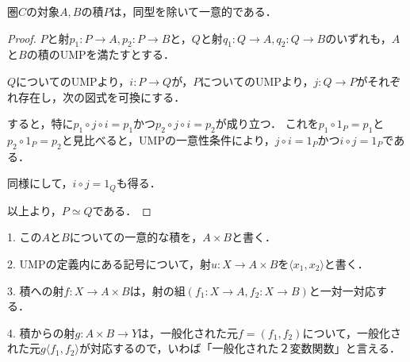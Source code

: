 \documentclass[uplatex, 12pt, dvipdfmx]{jsarticle}
\begin{document}
\begin{proposition}\label{prop-UMP-prod}
    圏$C$の対象$A,B$の積$P$は，同型を除いて一意的である．
\end{proposition}
\begin{proof}
    $P$と射$p_1:P\to A, p_2:P\to B$と，$Q$と射$q_1:Q\to A,q_2:Q\to B$のいずれも，$A$と$B$の積のUMPを満たすとする．

    $Q$についてのUMPより，$i:P\to Q$が，$P$についてのUMPより，$j:Q\to P$がそれぞれ存在し，次の図式を可換にする．
    \begin{center}
    \end{center}
    すると，特に$p_1\circ j\circ i=p_1$かつ$p_2\circ j\circ i=p_2$が成り立つ．
    これを$p_1\circ 1_P=p_1$と$p_2\circ 1_P=p_2$と見比べると，UMPの一意性条件により，$j\circ i=1_P$かつ$i\circ j=1_P$である．

    同様にして，$i\circ j=1_Q$も得る．

    以上より，$P\simeq Q$である．
\end{proof}
\begin{notation*}
    1. この$A$と$B$についての一意的な積を，$A\times B$と書く．

    2. UMPの定義内にある記号について，射$u:X\to A\times B$を$\langle x_1,x_2\rangle$と書く．

    3. 積への射$f:X\to A\times B$は，射の組$(f_1:X\to A,f_2:X\to B)$と一対一対応する．

    4. 積からの射$g:A\times B\to Y$は，一般化された元$f=(f_1,f_2)$について，一般化された元$g\langle f_1,f_2\rangle$が対応するので，いわば「一般化された２変数関数」と言える．
    \begin{center}
    \end{center}
\end{notation*}
\end{document}
